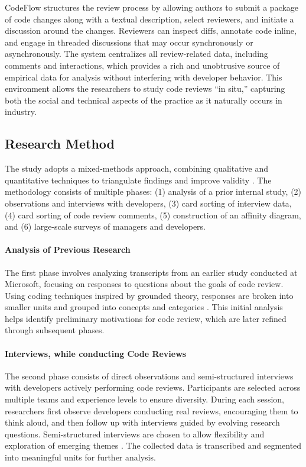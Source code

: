 CodeFlow structures the review process by allowing authors to submit a package of code changes along with a textual description, select reviewers, and initiate a discussion around the changes. Reviewers can inspect diffs, annotate code inline, and engage in threaded discussions that may occur synchronously or asynchronously. The system centralizes all review-related data, including comments and interactions, which provides a rich and unobtrusive source of empirical data for analysis without interfering with developer behavior. This environment allows the researchers to study code reviews “in situ,” capturing both the social and technical aspects of the practice as it naturally occurs in industry.

\subsection{Research Method}

The study adopts a mixed-methods approach, combining qualitative and quantitative techniques to triangulate findings and improve validity \cite{creswell2009research}. The methodology consists of multiple phases: (1) analysis of a prior internal study, (2) observations and interviews with developers, (3) card sorting of interview data, (4) card sorting of code review comments, (5) construction of an affinity diagram, and (6) large-scale surveys of managers and developers.

\paragraph{Analysis of Previous Research}
The first phase involves analyzing transcripts from an earlier study conducted at Microsoft, focusing on responses to questions about the goals of code review. Using coding techniques inspired by grounded theory, responses are broken into smaller units and grouped into concepts and categories \cite{berg2004qualitative,adolph2011grounded}. This initial analysis helps identify preliminary motivations for code review, which are later refined through subsequent phases.

\paragraph{Interviews, while conducting Code Reviews}
The second phase consists of direct observations and semi-structured interviews with developers actively performing code reviews. Participants are selected across multiple teams and experience levels to ensure diversity. During each session, researchers first observe developers conducting real reviews, encouraging them to think aloud, and then follow up with interviews guided by evolving research questions. Semi-structured interviews are chosen to allow flexibility and exploration of emerging themes \cite{lindlof2002qualitative,weiss1995learning}. The collected data is transcribed and segmented into meaningful units for further analysis.

